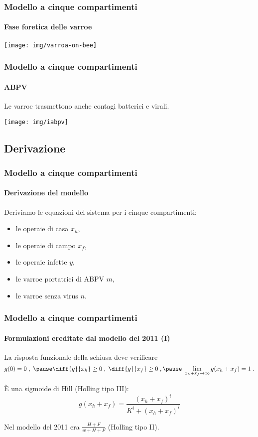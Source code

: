 \documentclass[]{beamer}
\begin{document}
\begin{frame}
    \frametitle{Modello a cinque compartimenti}
    \framesubtitle{Fase foretica delle varroe}

    \begin{center}
        \texttt{[image: img/varroa-on-bee]}
    \end{center}
\end{frame}

\begin{frame}
    \frametitle{Modello a cinque compartimenti}
    \framesubtitle{ABPV}

    Le varroe trasmettono anche contagi batterici e virali.

    \pause
    \begin{center}
        \texttt{[image: img/iabpv]}
    \end{center}
\end{frame}


\subsection{Derivazione}


\begin{frame}
    \frametitle{Modello a cinque compartimenti}
    \framesubtitle{Derivazione del modello}

    Deriviamo le equazioni del sistema per i cinque compartimenti:
    \begin{itemize}
        \item \pause le operaie di casa $x_h$,
        \item \pause le operaie di campo $x_f$,
        \item \pause le operaie infette $y$,
        \item \pause le varroe portatrici di ABPV $m$,
        \item \pause le varroe senza virus $n$.
    \end{itemize}
\end{frame}

\begin{frame}
    \frametitle{Modello a cinque compartimenti}
    \framesubtitle{Formulazioni ereditate dal modello del 2011 (I)}

    La risposta funzionale della schiusa deve verificare
    $$g(0)=0 \; , \; \pause \diff{g}{x_h} \geq 0 \; , \; \diff{g}{x_f} \geq 0 \; , %
    \pause \; \lim_{x_h+x_f \to \infty} g(x_h+x_f)=1 \; .$$

    \pause
    È una sigmoide di Hill (Holling tipo III):
    $$g(x_h + x_f) = \frac{ (x_h+x_f)^i }{ K^i + (x_h+x_f)^i }$$

    \pause Nel modello del 2011 era $\frac{H+F}{w+H+F}$ (Holling tipo II).
\end{frame}
\end{document}

